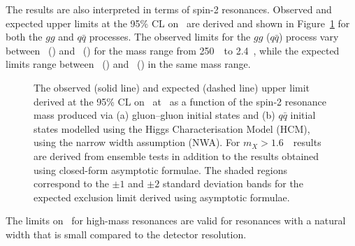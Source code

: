 The results are also interpreted in terms of spin-2 resonances. Observed and expected upper 
limits at the 95\% CL
on \sigxbr~are derived and shown in Figure~\ref{fig:limit-spin2-high-mass} for both the $gg$
and $q\bar{q}$ processes. 
The observed limits for the $gg$ ($q\bar{q}$) process
vary between \highmasslowlimitgg~(\highmasslowlimitqq) 
and \highmasshighlimitgg~(\highmasshighlimitqq) for the mass range from 250~\GeV\ to 2.4~\TeV,
while the expected limits range between \highmasslowlimitggexp~(\highmasslowlimitqqexp)
and \highmasshighlimitggexp~(\highmasshighlimitqqexp) in the same mass range. 


\begin{figure}
\begin{center}
%
\end{center}
\caption{The observed (solid line) and expected (dashed line) upper limit derived at the 95\% CL
on \sigxbr~at \sqtt~as a function of the spin-2
resonance mass produced via (a) gluon--gluon initial states and 
(b) $q\bar{q}$ initial states modelled using the Higgs Characterisation Model (HCM), using
the narrow width assumption (NWA).
For $m_X> 1.6$~\TeV\ results are derived from ensemble tests in addition to the results obtained 
using closed-form asymptotic formulae.
The shaded regions correspond to the $\pm 1$ and $\pm 2$ standard deviation 
bands for the expected exclusion limit derived using asymptotic formulae.}
\label{fig:limit-spin2-high-mass}
\end{figure}

The limits on \sigxbr\ for high-mass resonances are valid for resonances with a natural width that is
small compared to the detector resolution.
